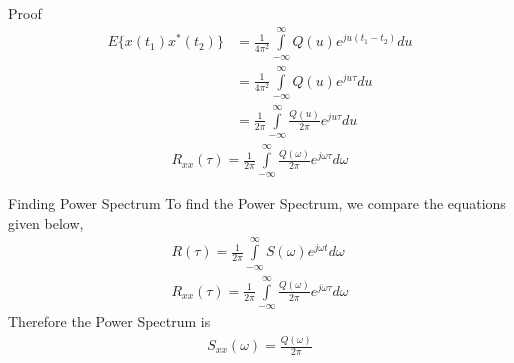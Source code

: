 \documentclass{beamer}
\begin{document}
\begin{frame}{Proof}
\begin{align}
    E\{x(t_1)x^*(t_2)\} &= \frac{1}{4\pi^2} \int\limits_{-\infty}^\infty Q(u) e^{ju(t_1 - t_2)} du\\
    &= \frac{1}{4\pi^2} \int\limits_{-\infty}^\infty Q(u) e^{ju\tau} du\\
    &= \frac{1}{2\pi} \int\limits_{-\infty}^\infty \frac{Q(u)}{2\pi} e^{ju \tau} du
\end{align}
\begin{align}
    R_{xx}(\tau) = \frac{1}{2\pi} \int\limits_{-\infty}^\infty \frac{Q(\omega)}{2\pi} e^{j\omega \tau} d\omega
\end{align}
\end{frame}

\begin{frame}{Finding Power Spectrum}
To find the Power Spectrum, we compare the equations given below,
\begin{align}
    R(\tau) = \frac{1}{2\pi} \int\limits_{-\infty}^\infty S(\omega) e^{j\omega t} d\omega\\
    R_{xx}(\tau) = \frac{1}{2\pi} \int\limits_{-\infty}^\infty \frac{Q(\omega)}{2\pi} e^{j\omega \tau} d\omega
\end{align}
Therefore the Power Spectrum is
\begin{align}
    S_{xx} (\omega) = \frac{Q(\omega)}{2\pi}
\end{align}
\end{frame}
\end{document}
